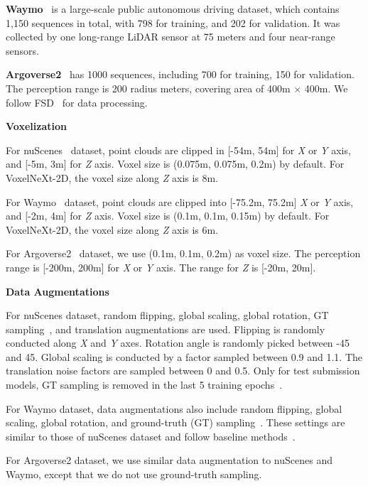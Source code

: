 \documentclass[10pt,twocolumn,letterpaper]{article}
\begin{document}
{\vspace{0.5em}
\noindent
\textbf{Waymo}~\cite{waymo} is a large-scale public autonomous driving dataset, which contains 1,150 sequences in total, with 798 for training, and 202 for validation. It was collected by one long-range LiDAR sensor at 75 meters and four near-range sensors. 

\vspace{0.5em}
\noindent
\textbf{Argoverse2}~\cite{argo2} has 1000 sequences, including 700 for training, 150 for validation. The perception range is 200 radius meters, covering area of 400m × 400m. We follow FSD~\cite{fsd} for data processing.

\vspace{0.5em}
\noindent
\textbf{Voxelization}

For nuScenes~\cite{nuscenes} dataset, point clouds are clipped in [-54m, 54m] for {\em X} or {\em Y} axis, and [-5m, 3m] for {\em Z} axis. Voxel size is (0.075m, 0.075m, 0.2m) by default. For VoxelNeXt-2D, the voxel size along {\em Z} axis is 8m. 

For Waymo~\cite{waymo} dataset, point clouds are clipped into [-75.2m, 75.2m] {\em X} or {\em Y} axis, and [-2m, 4m] for {\em Z} axis. Voxel size is (0.1m, 0.1m, 0.15m) by default.  For VoxelNeXt-2D, the voxel size along {\em Z} axis is 6m. 

For Argoverse2~\cite{argo2} dataset, we use (0.1m, 0.1m, 0.2m) as voxel size. The perception range is [-200m, 200m] for {\em X} or {\em Y} axis. The range for {\em Z} is [-20m, 20m].

\vspace{0.5em}
\noindent
\textbf{Data Augmentations}

For nuScenes dataset, random flipping, global scaling, global rotation, GT sampling~\cite{second}, and  translation augmentations are used. Flipping is randomly conducted along {\em X} and {\em Y} axes. Rotation angle is randomly picked between -45 and 45. Global scaling is conducted by a factor sampled between 0.9 and 1.1. The translation noise factors are sampled between 0 and 0.5. Only for test submission models, GT sampling is removed in the last 5 training epochs~\cite{uvtr}. 

For Waymo dataset, data augmentations also include random flipping, global scaling, global rotation, and ground-truth (GT) sampling~\cite{second}. These settings are similar to those of nuScenes dataset and follow baseline methods~\cite{centerpoint,pvrcnn}.

For Argoverse2 dataset, we use similar data augmentation to nuScenes and Waymo, except that we do not use ground-truth sampling.

}
\end{document}
